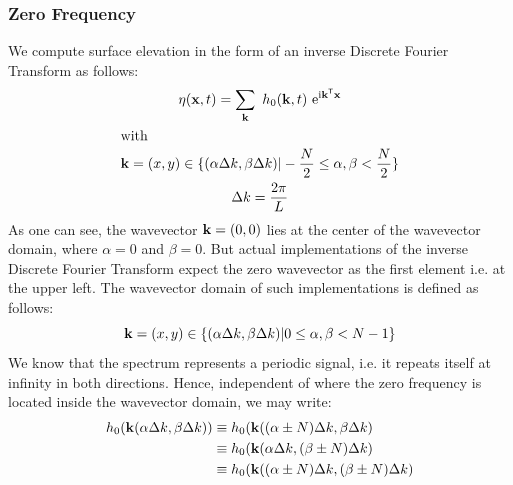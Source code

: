 \subsubsection{Zero Frequency}
%
\newcommand{\ccellnum}[2]{\cellcolor{#1}\num{#2}}
\newcommand{\mcleft}[2]{\multicolumn{1}{!{\color{#1}\vline}S}{#2}}
\newcommand{\mcright}[2]{\multicolumn{1}{S !{\color{#1}\vline}}{#2}}
\newcommand{\mcleftright}[2]{\multicolumn{1}{!{\color{#1}\vline} S !{\color{#1}\vline}}{#2}}
%
We compute surface elevation in the form of an inverse Discrete Fourier Transform as follows:
\begin{gather*}
\eta(\mathbf{x}, t) = \sum_{\mathbf{k}}~h_0(\mathbf{k},t)~\mathrm{e}^{\mathrm{i}\mathbf{k}^{\mathsf{T}}\mathbf{x}} \\
\intertext{with}
\mathbf{k} = (x,y)\in\{(\alpha\Delta k,\beta\Delta k)|
-\frac{N}{2}\leq\alpha,\beta<\frac{N}{2}\} \\
\Delta k = \frac{2\pi}{L}
\end{gather*}
As one can see, the wavevector $\mathbf{k} = (0,0)$ lies at the center of the wavevector domain,
where $\alpha=0$ and $\beta=0$. But actual implementations of the inverse Discrete Fourier Transform
expect the zero wavevector as the first element i.e. at the upper left. The wavevector domain
of such implementations is defined as follows:
\begin{equation*}
\mathbf{k} = (x,y)\in\{(\alpha\Delta k,\beta\Delta k)|
0\leq\alpha,\beta<N-1\}
\end{equation*}
We know that the spectrum represents a periodic signal, i.e. it repeats itself at infinity in both directions.
Hence, independent of where the zero frequency is located inside the wavevector domain, we may write:
\begin{align*}
 h_0(\mathbf{k}(\alpha\Delta k,\beta\Delta k)) &\equiv h_0(\mathbf{k}((\alpha\pm N)\Delta k, \beta\Delta k) \\
					     &\equiv h_0(\mathbf{k}(\alpha\Delta k, (\beta\pm N)\Delta k) \\
					     &\equiv h_0(\mathbf{k}((\alpha\pm N)\Delta k, (\beta\pm N)\Delta k)
\end{align*}
%
